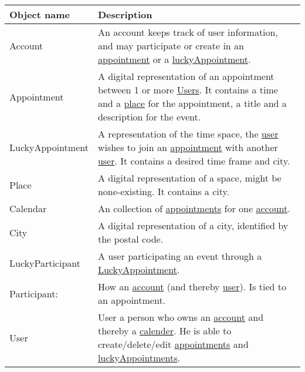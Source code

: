 {\tabulinesep=1.2mm
\begin{tabu}{ | p{3cm} | p{13cm} |}\hline
    Object name 			& 		Description\\\hline
    Account 				& 		An account keeps track of user information, and may participate or create in an \uline{appointment} or a \uline{luckyAppointment}. \\\hline
	Appointment				&		A digital representation of an appointment between 1 or more \uline{Users}. It contains a time and a \uline{place} for the appointment, a title and a description for the event.\\\hline
	LuckyAppointment		&		A representation of the time space, the \uline{user} wishes to join an \uline{appointment} with another \uline{user}. It contains a desired time frame and city.\\\hline
    Place 					& 		A digital representation of a space, might be none-existing. It contains a city.\\\hline
	Calendar				&		An collection of \uline{appointments} for one \uline{account}.\\ \hline
    City 					& 		A digital representation of a city, identified by the postal code.\\\hline
	LuckyParticipant		&		A user participating an event through a \uline{LuckyAppointment}.\\\hline
	Participant: 			&		How an \uline{account} (and thereby \uline{user}). Is tied to an appointment.\\\hline
    User  					& 		User a person who owns an \uline{account} and thereby a \uline{calender}. He is able to create/delete/edit \uline{appointments} and  \uline{luckyAppointments}. \\\hline
\end{tabu}
}